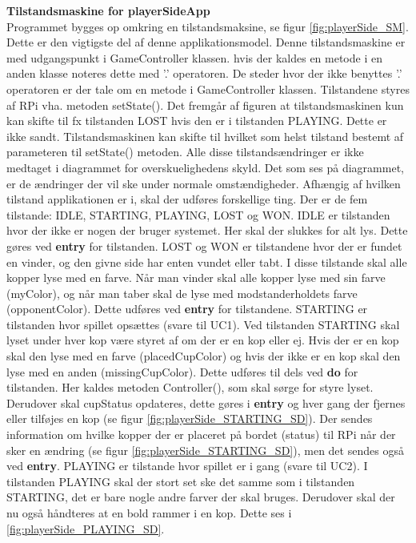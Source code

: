 \documentclass[Arkitektur/System_main.tex]{subfiles}
\begin{document}
{\large\textbf{Tilstandsmaskine for playerSideApp}}\\
Programmet bygges op omkring en tilstandsmaksine, se figur \ref{fig:playerSide_SM}. Dette er den vigtigste del af denne applikationsmodel. Denne tilstandsmaskine er med udgangspunkt i GameController klassen. hvis der kaldes en metode i en anden klasse noteres dette med '.' operatoren. De steder hvor der ikke benyttes '.' operatoren er der tale om en metode i GameController klassen. Tilstandene styres af RPi vha. metoden setState(). Det fremgår af figuren at tilstandsmaskinen kun kan skifte til fx tilstanden LOST hvis den er i tilstanden PLAYING. Dette er ikke sandt. Tilstandsmaskinen kan skifte til hvilket som helst tilstand bestemt af parameteren til setState() metoden. Alle disse tilstandsændringer er ikke medtaget i diagrammet for overskuelighedens skyld. Det som ses på diagrammet, er de ændringer der vil ske under normale omstændigheder. Afhængig af hvilken tilstand applikationen er i, skal der udføres forskellige ting. Der er de fem tilstande: IDLE, STARTING, PLAYING, LOST og WON. IDLE er tilstanden hvor der ikke er nogen der bruger systemet. Her skal der slukkes for alt lys. Dette gøres ved \textbf{entry} for tilstanden. LOST og WON er tilstandene hvor der er fundet en vinder, og den givne side har enten vundet eller tabt. I disse tilstande skal alle kopper lyse med en farve. Når man vinder skal alle kopper lyse med sin farve (myColor), og når man taber skal de lyse med modstanderholdets farve (opponentColor). Dette udføres ved \textbf{entry} for tilstandene. STARTING er tilstanden hvor spillet opsættes (svare til UC1). Ved tilstanden STARTING skal lyset under hver kop være styret af om der er en kop eller ej. Hvis der er en kop skal den lyse med en farve (placedCupColor) og hvis der ikke er en kop skal den lyse med en anden (missingCupColor). Dette udføres til dels ved \textbf{do} for tilstanden. Her kaldes metoden Controller(), som skal sørge for styre lyset. Derudover skal cupStatus opdateres, dette gøres i \textbf{entry} og hver gang der fjernes eller tilføjes en kop (se figur \ref{fig:playerSide_STARTING_SD}). Der sendes information om hvilke kopper der er placeret på bordet (status) til RPi når der sker en ændring (se figur \ref{fig:playerSide_STARTING_SD}), men det sendes også ved \textbf{entry}.
PLAYING er tilstande hvor spillet er i gang (svare til UC2). I tilstanden PLAYING skal der stort set ske det samme som i tilstanden STARTING, det er bare nogle andre farver der skal bruges. Derudover skal der nu også håndteres at en bold rammer i en kop. Dette ses i \ref{fig:playerSide_PLAYING_SD}.
\end{document}

